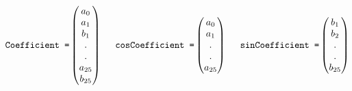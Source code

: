 \documentclass[12pt, a4paper]{report}
\begin{document}
\begin{equation*}
\texttt{Coefficient =}
\begin{pmatrix}
a_0\\
a_1\\
b_1\\
.\\
.\\
a_{25}\\
b_{25}\\
\end{pmatrix}
\hspace{0.5cm}
\texttt{cosCoefficient =}
\begin{pmatrix}
a_0\\
a_1\\
.\\
.\\
a_{25}\\
\end{pmatrix}
\hspace{0.5cm}
\texttt{sinCoefficient =}
\begin{pmatrix}
b_1\\
b_2\\
.\\
.\\
b_{25}\\
\end{pmatrix}
\end{equation*}
\end{document}
